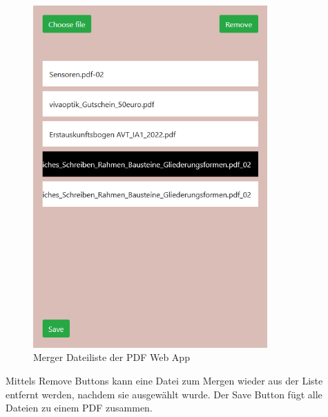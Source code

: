 \begin{figure}[!htbp]
	\centering
	\includegraphics[width=0.8\textwidth]{"images/mergelist.png"}
	\caption{Merger Dateiliste der PDF Web App}
	\label{fig:mergelist}
\end{figure}
Mittels Remove Buttons kann eine Datei zum Mergen wieder aus der Liste entfernt werden, nachdem sie ausgewählt wurde. Der Save Button fügt alle Dateien zu einem PDF zusammen.




